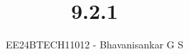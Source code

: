 \documentclass[journal]{IEEEtran}
\begin{document}

\vspace{3cm}

\title{9.2.1}
\author{EE24BTECH11012 - Bhavanisankar G S}
{\let\newpage\relax\maketitle}

\renewcommand{\thefigure}{\theenumi}
\renewcommand{\thetable}{\theenumi}
\setlength{\intextsep}{10pt} %


\renewcommand{\thetable}{\theenumi}
\end{document}
